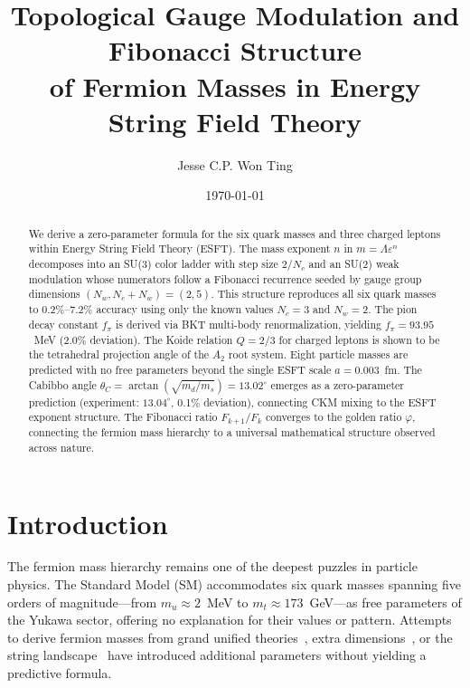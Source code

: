 ﻿\documentclass[twocolumn,preprintnumbers,amsmath,amssymb,prd]{revtex4-2}
\newcommand{\koppa}{\text{\usefont{T1}{lmr}{m}{n}\symbol{"DE}}}%
\renewcommand{\koppa}{a}%
\begin{document}
\title{Topological Gauge Modulation and Fibonacci Structure\\of Fermion Masses in Energy String Field Theory}

\author{Jesse C.P. Won Ting}

\date{\today}

\begin{abstract}
We derive a zero-parameter formula for the six quark masses and three charged leptons within Energy String Field Theory (ESFT). The mass exponent $n$ in $m = \Lambda\varepsilon^n$ decomposes into an SU(3) color ladder with step size $2/N_c$ and an SU(2) weak modulation whose numerators follow a Fibonacci recurrence seeded by gauge group dimensions $(N_w, N_c+N_w) = (2,5)$. This structure reproduces all six quark masses to 0.2\%--7.2\% accuracy using only the known values $N_c=3$ and $N_w=2$. The pion decay constant $f_\pi$ is derived via BKT multi-body renormalization, yielding $f_\pi = 93.95$~MeV (2.0\% deviation). The Koide relation $Q = 2/3$ for charged leptons is shown to be the tetrahedral projection angle of the $A_2$ root system. Eight particle masses are predicted with no free parameters beyond the single ESFT scale $\koppa = 0.003$~fm. The Cabibbo angle $\theta_C = \arctan(\sqrt{m_d/m_s}) = 13.02^\circ$ emerges as a zero-parameter prediction (experiment: $13.04^\circ$, 0.1\% deviation), connecting CKM mixing to the ESFT exponent structure. The Fibonacci ratio $F_{k+1}/F_k$ converges to the golden ratio $\varphi$, connecting the fermion mass hierarchy to a universal mathematical structure observed across nature.
\end{abstract}

\maketitle

\section{Introduction}

The fermion mass hierarchy remains one of the deepest puzzles in particle physics. The Standard Model (SM) accommodates six quark masses spanning five orders of magnitude---from $m_u \approx 2$~MeV to $m_t \approx 173$~GeV---as free parameters of the Yukawa sector, offering no explanation for their values or pattern. Attempts to derive fermion masses from grand unified theories~\cite{Georgi1974}, extra dimensions~\cite{Randall1999}, or the string landscape~\cite{Susskind2003} have introduced additional parameters without yielding a predictive formula.
\end{document}
